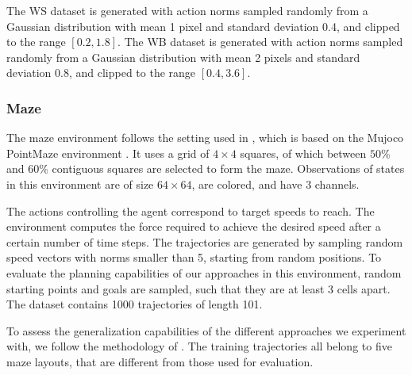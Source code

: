 \documentclass{article} %
\begin{document}
The WS dataset is generated with action norms sampled randomly from a Gaussian distribution with mean 1 pixel and standard deviation 0.4, and clipped to the range $[0.2,1.8]$. The WB dataset is generated with action norms sampled randomly from a Gaussian distribution with mean 2 pixels and standard deviation 0.8, and clipped to the range $[0.4,3.6]$.


\subsubsection{Maze}

The maze environment follows the setting used in \cite{sobal2025learningrewardfreeofflinedata}, which is based on the Mujoco PointMaze environment \cite{fu2021d4rldatasetsdeepdatadriven}. It uses a grid of $4\times4$ squares, of which between $50\%$ and $60\%$ contiguous squares are selected to form the maze. Observations of states in this environment are of size $64\times64$, are colored, and have 3 channels. 

The actions controlling the agent correspond to target speeds to reach. The environment computes the force required to achieve the desired speed after a certain number of time steps. The trajectories are generated by sampling random speed vectors with norms smaller than 5, starting from random positions. To evaluate the planning capabilities of our approaches in this environment, random starting points and goals are sampled, such that they are at least 3 cells apart. The dataset contains 1000 trajectories of length 101.

To assess the generalization capabilities of the different approaches we experiment with, we follow the methodology of \cite{sobal2025learningrewardfreeofflinedata}. The training trajectories all belong to five maze layouts, that are different from those used for evaluation. 
\end{document}
